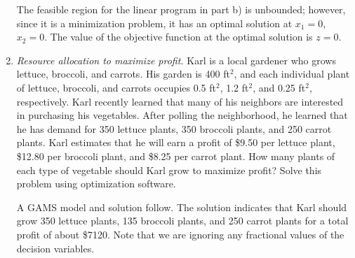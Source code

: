 \begin{enumerate}
\begin{solution}
\begin{center}
\end{center}

The feasible region for the linear program in part b) is unbounded;
however, since it is a minimization problem, it has an optimal
solution at $x_1=0$, $x_2=0$. The value of the objective function at
the optimal solution is $z=0$.

\begin{center}
\end{center}

\end{solution}

\item \emph{Resource allocation to maximize profit.} 
Karl is a local gardener who grows lettuce, broccoli, and carrots. His garden is 
400 ft$^2$, and each individual plant of lettuce, broccoli, and carrots occupies 
0.5 ft$^2$, 1.2 ft$^2$, and 0.25 ft$^2$, respectively. Karl recently learned that 
many of his neighbors are interested in purchasing his vegetables. After polling the 
neighborhood, he learned that he has demand for 350 lettuce plants, 350 broccoli plants, 
and 250 carrot plants. Karl estimates that he will earn a profit of \$9.50 per 
lettuce plant, \$12.80 per broccoli plant, and \$8.25 per carrot plant. How many 
plants of each type of vegetable should Karl grow to maximize profit? Solve this 
problem using optimization software.

\begin{solution}
\bs A GAMS model and solution follow. The solution indicates that Karl should grow 
350 lettuce plants, 135 broccoli plants, and 250 carrot plants for a total profit of
about \$\num{7120}. Note that we are ignoring any fractional values of the 
decision variables.


\end{solution}
\end{enumerate}
